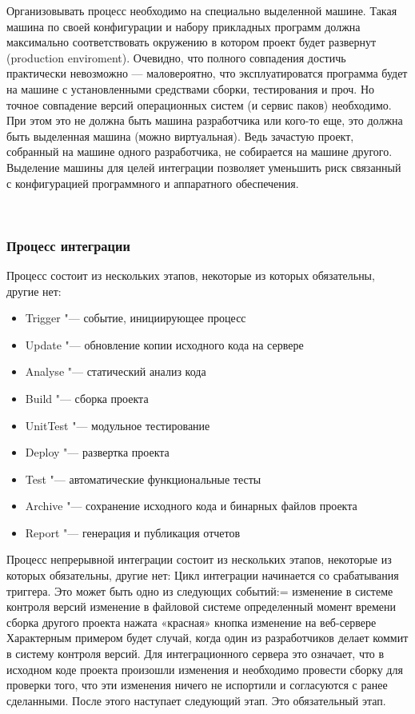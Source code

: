 \documentclass{../industrial-development}
\begin{document}
\lecturenotes
Организовывать процесс необходимо на специально выделенной машине. Такая машина по своей конфигурации и набору прикладных программ должна максимально соответствовать окружению в котором проект будет развернут (production enviroment). Очевидно, что полного совпадения достичь практически невозможно — маловероятно, что эксплуатироватся программа будет на машине с установленными средствами сборки, тестирования и проч. Но точное совпадение версий операционных систем (и сервис паков) необходимо.
При этом это не должна быть машина разработчика или кого-то еще, это должна быть выделенная машина (можно виртуальная). Ведь зачастую проект, собранный на машине одного разработчика, не собирается на машине другого. Выделение машины для целей интеграции позволяет уменьшить риск связанный с конфигурацией программного и аппаратного обеспечения.


~\cite{Wiki_Continuous_integration}

\begin{frame} \frametitle{Процесс интеграции}
	\begin{block}{Процесс состоит из нескольких этапов, некоторые из которых обязательны, другие нет:}
		\begin{itemize}
			\item Trigger "--- событие, инициирующее процесс
			\item Update "--- обновление копии исходного кода на сервере
			\item Analyse "--- статический анализ кода
			\item Build "--- сборка проекта
			\item UnitTest "--- модульное тестирование
			\item Deploy "--- развертка проекта
			\item Test "--- автоматические функциональные тесты
			\item Archive "--- сохранение исходного кода и бинарных файлов проекта
			\item Report "--- генерация и публикация отчетов
		\end{itemize}
	\end{block}
\end{frame}
\lecturenotes
Процесс непрерывной интеграции состоит из нескольких этапов, некоторые из которых обязательны, другие нет:
Цикл интеграции начинается со срабатывания триггера. Это может быть одно из следующих событий:=
	изменение в системе контроля версий
	изменение в файловой системе
	определенный момент времени
	сборка другого проекта
	нажата «красная» кнопка
	изменение на веб-сервере
Характерным примером будет случай, когда один из разработчиков делает коммит в систему контроля версий. Для интеграционного сервера это означает, что в исходном коде проекта произошли изменения и необходимо провести сборку для проверки того, что эти изменения ничего не испортили и согласуются с ранее сделанными. После этого наступает следующий этап. Это обязательный этап.
\end{document}
